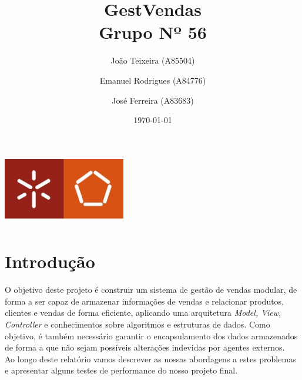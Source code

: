 \documentclass[a4paper]{report}
\begin{document}
\title{GestVendas\\ 
\large Grupo Nº 56}
\author{João Teixeira (A85504) \and Emanuel Rodrigues (A84776) \and José Ferreira (A83683)}
\date{\today}

\begin{center}
    \begin{minipage}{0.75\linewidth}
        \centering
        \includegraphics[width=0.4\textwidth]{eng.jpeg}\par\vspace{1cm}
        \vspace{1.5cm}
        \href{https://www.uminho.pt/PT}
        {\color{black}{\scshape\LARGE Universidade do Minho}} \par
        \vspace{1cm}
        \href{https://www.di.uminho.pt/}
        {\color{black}{\scshape\Large Departamento de Informática}} \par
        \vspace{1.5cm}
        \maketitle
    \end{minipage}
\end{center}

\tableofcontents

\pagebreak

\chapter{Introdução}

O objetivo deste projeto é construir um sistema de gestão de vendas modular,
de forma a ser capaz de armazenar informações de vendas e relacionar produtos,
clientes e vendas de forma eficiente, aplicando uma arquitetura \textit{Model, View,
Controller} e conhecimentos sobre algoritmos e estruturas de dados. Como objetivo, 
é também necessário garantir o encapsulamento dos dados armazenados de forma
a que não sejam possíveis alterações indevidas por agentes externos.\\
Ao longo deste relatório vamos descrever as nossas abordagens a estes problemas e
apresentar alguns testes de performance do nosso projeto final.
\end{document}
